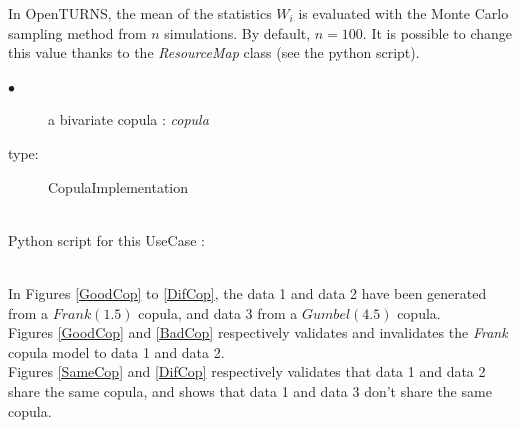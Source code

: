 In OpenTURNS, the mean of the statistics $W_i$ is evaluated with the Monte Carlo sampling method from $n$ simulations. By default, $n=100$. It is possible to change this value thanks to the \textit{ResourceMap} class (see the python script).


             {
               \begin{description}
               \item[$\bullet$] a bivariate copula : {\itshape copula}
               \item[type:] CopulaImplementation
               \end{description}
             }

             \textspace\\
             Python script for this UseCase :


             \textspace\\

             In Figures  \ref{GoodCop} to \ref{DifCop}, the data 1 and data 2  have been generated from a $Frank(1.5)$ copula, and data 3 from a $Gumbel(4.5)$ copula.\\
             Figures \ref{GoodCop} and \ref{BadCop} respectively validates and invalidates the \textit{Frank} copula model to data 1 and data 2.\\
             Figures \ref{SameCop} and  \ref{DifCop} respectively validates that data 1 and data 2 share the same copula, and shows that data 1 and data 3 don't share the same copula.\\


